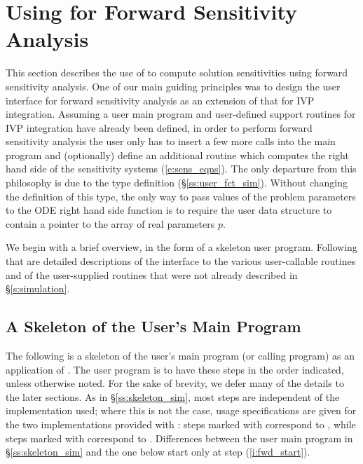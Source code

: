 \chapter{Using {\cvodes} for Forward Sensitivity Analysis}\label{s:forward}

This section describes the use of {\cvodes} to compute solution sensitivities using
forward sensitivity analysis. One of our main guiding principles was to design 
the {\cvodes} user interface for forward sensitivity analysis as an extension of
that for IVP integration. Assuming a user main program and user-defined support 
routines for IVP integration have already been defined, in order to perform 
forward sensitivity analysis the user only has to insert a few more calls 
into the main program and (optionally) define an additional routine which
computes the right hand side of the sensitivity systems (\ref{e:sens_eqns}). 
The only departure from this philosophy is due to the  type definition
(\S\ref{ss:user_fct_sim}). Without changing the definition of this type, the
only way to pass values of the problem parameters to the ODE right hand side
function is to require the user data structure  to contain a pointer
to the array of real parameters $p$.

We begin with a brief overview, in the form of a skeleton user program.
Following that are detailed descriptions of the interface to the
various user-callable routines and of the user-supplied routines that were not already
described in \S\ref{s:simulation}.

\section{A Skeleton of the User's Main Program}\label{ss:forward_usage}

The following is a skeleton of the user's main program (or calling
program) as an application of {\cvodes}. The user program is to have these 
steps in the order indicated, unless otherwise noted.
For the sake of brevity, we defer many of the details to the later sections.
As in \S\ref{ss:skeleton_sim}, most steps are independent of the {\nvector}
implementation used; where this is not the case, usage specifications are given for the
two implementations provided with {\cvodes}: steps marked with {\p} correspond to 
{\nvecp}, while steps marked with {\s} correspond to {\nvecs}.
Differences between the user main program in \S\ref{ss:skeleton_sim} and
the one below start only at step (\ref{i:fwd_start}).



